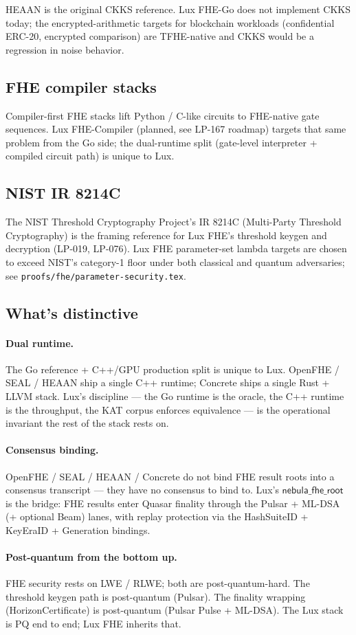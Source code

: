 HEAAN is the original CKKS reference. Lux FHE-Go does not implement
CKKS today; the encrypted-arithmetic targets for blockchain
workloads (confidential ERC-20, encrypted comparison) are TFHE-native
and CKKS would be a regression in noise behavior.

\subsection{FHE compiler stacks}

Compiler-first FHE stacks lift Python / C-like circuits to
FHE-native gate sequences. Lux FHE-Compiler (planned, see LP-167
roadmap) targets that same problem from the Go side; the dual-runtime
split (gate-level interpreter + compiled circuit path) is unique
to Lux.

\subsection{NIST IR 8214C}

The NIST Threshold Cryptography Project's IR 8214C (Multi-Party
Threshold Cryptography) is the framing reference for Lux FHE's
threshold keygen and decryption (LP-019, LP-076). Lux FHE
parameter-set lambda targets are chosen to exceed NIST's
category-1 floor under both classical and quantum adversaries; see
\texttt{proofs/fhe/parameter-security.tex}.

\subsection{What's distinctive}

\paragraph{Dual runtime.} The Go reference + C++/GPU production
split is unique to Lux. OpenFHE / SEAL / HEAAN ship a single C++
runtime; Concrete ships a single Rust + LLVM stack. Lux's
discipline --- the Go runtime is the oracle, the C++ runtime is
the throughput, the KAT corpus enforces equivalence --- is the
operational invariant the rest of the stack rests on.

\paragraph{Consensus binding.} OpenFHE / SEAL / HEAAN / Concrete
do not bind FHE result roots into a consensus transcript --- they
have no consensus to bind to. Lux's $\mathsf{nebula\_fhe\_root}$ is
the bridge: FHE results enter Quasar finality through the Pulsar
+ ML-DSA (+ optional Beam) lanes, with replay protection via the
HashSuiteID + KeyEraID + Generation bindings.

\paragraph{Post-quantum from the bottom up.} FHE security rests on
LWE / RLWE; both are post-quantum-hard. The threshold keygen path
is post-quantum (Pulsar). The finality wrapping (HorizonCertificate)
is post-quantum (Pulsar Pulse + ML-DSA). The Lux stack is PQ end
to end; Lux FHE inherits that.
